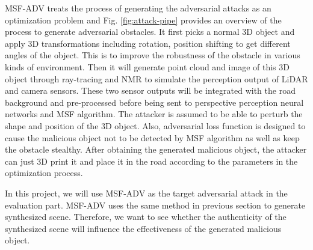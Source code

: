 MSF-ADV\cite{msf-adv} treats the process of generating the adversarial attacks as an optimization problem and Fig. \ref{fig:attack-pipe} provides an overview of the process to generate adversarial obstacles. 
It first picks a normal 3D object and apply 3D transformations including rotation, position shifting to get different angles of the object.
This is to improve the robustness of the obstacle in various kinds of environment.
Then it will generate point cloud and image of this 3D object through ray-tracing\cite{ray-tracing} and NMR\cite{nmr} to simulate the perception output of LiDAR and camera sensors.
These two sensor outputs will be integrated with the road background and pre-processed before being sent to perspective perception neural networks and MSF algorithm.
The attacker is assumed to be able to perturb the shape and position of the 3D object.
Also, adversarial loss function is designed to cause the malicious object not to be detected by MSF algorithm as well as keep the obstacle stealthy.
After obtaining the generated malicious object, the attacker can just 3D print it and place it in the road according to the parameters in the optimization process.

In this project, we will use MSF-ADV\cite{msf-adv} as the target adversarial attack in the evaluation part.
MSF-ADV\cite{msf-adv} uses the same method in previous section to generate synthesized scene. 
Therefore, we want to see whether the authenticity of the synthesized scene will influence the effectiveness of the generated malicious object.




